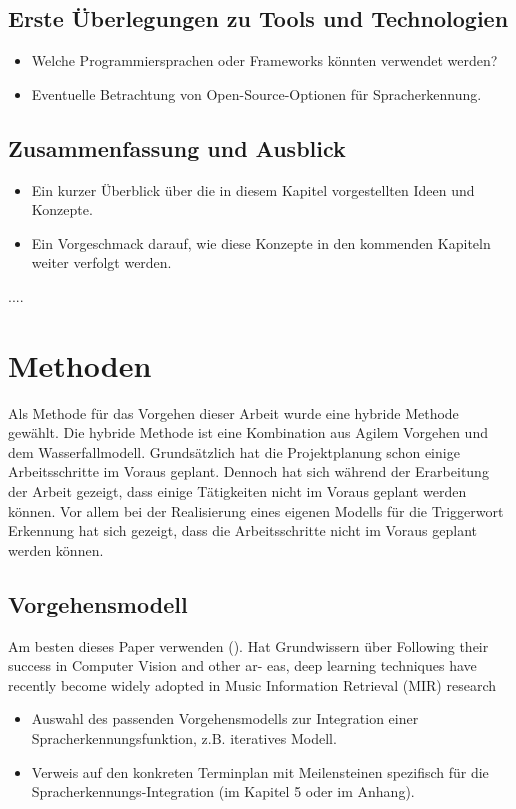 \documentclass[11pt,a4paper]{article}
\begin{document}
\subsection{Erste Überlegungen zu Tools und Technologien}
\begin{itemize}
	\item Welche Programmiersprachen oder Frameworks könnten verwendet werden?
	\item Eventuelle Betrachtung von Open-Source-Optionen für Spracherkennung.
\end{itemize}

\subsection{Zusammenfassung und Ausblick}
\begin{itemize}
	\item Ein kurzer Überblick über die in diesem Kapitel vorgestellten Ideen und Konzepte.
	\item Ein Vorgeschmack darauf, wie diese Konzepte in den kommenden Kapiteln weiter verfolgt werden.
\end{itemize}


....

\newpage \section{Methoden}
Als Methode für das Vorgehen dieser Arbeit wurde eine hybride Methode gewählt. Die hybride Methode
ist eine Kombination aus Agilem Vorgehen und dem Wasserfallmodell. Grundsätzlich hat die 
Projektplanung schon einige Arbeitsschritte im Voraus geplant. Dennoch hat sich während der 
Erarbeitung der Arbeit gezeigt, dass einige Tätigkeiten nicht im Voraus geplant werden können.
Vor allem bei der Realisierung eines eigenen Modells für die Triggerwort Erkennung hat sich
gezeigt, dass die Arbeitsschritte nicht im Voraus geplant werden können.

\subsection{Vorgehensmodell}
Am besten dieses Paper verwenden (\cite{choi2018tutorial}). Hat Grundwissern über 
Following their success in Computer Vision and other ar- eas, deep learning techniques have 
recently become widely adopted in Music Information Retrieval (MIR) research
\begin{itemize}
	\item Auswahl des passenden Vorgehensmodells zur Integration einer Spracherkennungsfunktion, z.B. iteratives Modell.
	\item Verweis auf den konkreten Terminplan mit Meilensteinen spezifisch für die Spracherkennungs-Integration (im Kapitel 5 oder im Anhang).
\end{itemize}
\end{document}

